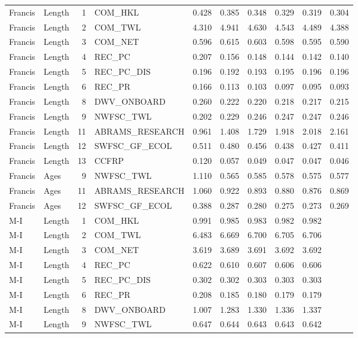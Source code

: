 \documentclass[11pt,
  english,
]{article}
\begin{document}
\begin{landscape}
\begin{longtable}[t]{llrlrrrrrr}
\endfoot
\bottomrule
\endlastfoot
Francis & Length & 1 & COM\_HKL & 0.428 & 0.385 & 0.348 & 0.329 & 0.319 & 0.304\\
Francis & Length & 2 & COM\_TWL & 4.310 & 4.941 & 4.630 & 4.543 & 4.489 & 4.388\\
Francis & Length & 3 & COM\_NET & 0.596 & 0.615 & 0.603 & 0.598 & 0.595 & 0.590\\
Francis & Length & 4 & REC\_PC & 0.207 & 0.156 & 0.148 & 0.144 & 0.142 & 0.140\\
Francis & Length & 5 & REC\_PC\_DIS & 0.196 & 0.192 & 0.193 & 0.195 & 0.196 & 0.196\\
Francis & Length & 6 & REC\_PR & 0.166 & 0.113 & 0.103 & 0.097 & 0.095 & 0.093\\
Francis & Length & 8 & DWV\_ONBOARD & 0.260 & 0.222 & 0.220 & 0.218 & 0.217 & 0.215\\
Francis & Length & 9 & NWFSC\_TWL & 0.202 & 0.229 & 0.246 & 0.247 & 0.247 & 0.246\\
Francis & Length & 11 & ABRAMS\_RESEARCH & 0.961 & 1.408 & 1.729 & 1.918 & 2.018 & 2.161\\
Francis & Length & 12 & SWFSC\_GF\_ECOL & 0.511 & 0.480 & 0.456 & 0.438 & 0.427 & 0.411\\
Francis & Length & 13 & CCFRP & 0.120 & 0.057 & 0.049 & 0.047 & 0.047 & 0.046\\
Francis & Ages & 9 & NWFSC\_TWL & 1.110 & 0.565 & 0.585 & 0.578 & 0.575 & 0.577\\
Francis & Ages & 11 & ABRAMS\_RESEARCH & 1.060 & 0.922 & 0.893 & 0.880 & 0.876 & 0.869\\
Francis & Ages & 12 & SWFSC\_GF\_ECOL & 0.388 & 0.287 & 0.280 & 0.275 & 0.273 & 0.269\\
M-I & Length & 1 & COM\_HKL & 0.991 & 0.985 & 0.983 & 0.982 & 0.982 & \\
M-I & Length & 2 & COM\_TWL & 6.483 & 6.669 & 6.700 & 6.705 & 6.706 & \\
M-I & Length & 3 & COM\_NET & 3.619 & 3.689 & 3.691 & 3.692 & 3.692 & \\
M-I & Length & 4 & REC\_PC & 0.622 & 0.610 & 0.607 & 0.606 & 0.606 & \\
M-I & Length & 5 & REC\_PC\_DIS & 0.302 & 0.302 & 0.303 & 0.303 & 0.303 & \\
M-I & Length & 6 & REC\_PR & 0.208 & 0.185 & 0.180 & 0.179 & 0.179 & \\
M-I & Length & 8 & DWV\_ONBOARD & 1.007 & 1.283 & 1.330 & 1.336 & 1.337 & \\
M-I & Length & 9 & NWFSC\_TWL & 0.647 & 0.644 & 0.643 & 0.643 & 0.642 & \\

\end{longtable}
\end{landscape}
\end{document}

